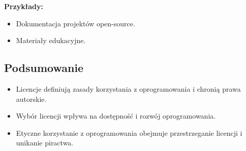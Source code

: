 \textbf{Przykłady:}
\begin{itemize}
    \item Dokumentacja projektów open-source.
    \item Materiały edukacyjne.
\end{itemize}

\subsection{Podsumowanie}
\begin{itemize}
    \item Licencje definiują zasady korzystania z oprogramowania i chronią prawa autorskie.
    \item Wybór licencji wpływa na dostępność i rozwój oprogramowania.
    \item Etyczne korzystanie z oprogramowania obejmuje przestrzeganie licencji i unikanie piractwa.
\end{itemize}
